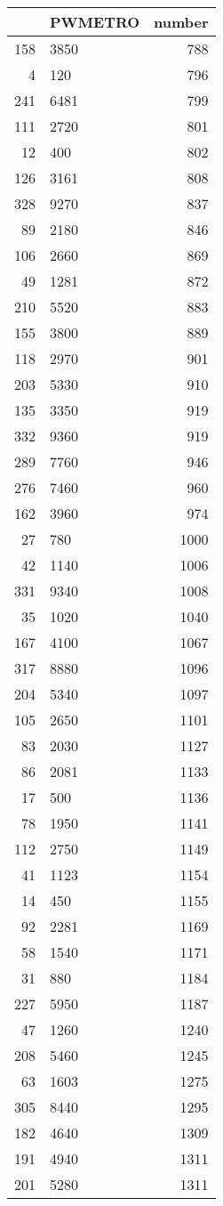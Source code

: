 \begin{table}[ht]
\centering
\begin{tabular}{rlr}
  \hline
 & PWMETRO & number \\ 
  \hline
158 & 3850 & 788 \\ 
  4 & 120 & 796 \\ 
  241 & 6481 & 799 \\ 
  111 & 2720 & 801 \\ 
  12 & 400 & 802 \\ 
  126 & 3161 & 808 \\ 
  328 & 9270 & 837 \\ 
  89 & 2180 & 846 \\ 
  106 & 2660 & 869 \\ 
  49 & 1281 & 872 \\ 
  210 & 5520 & 883 \\ 
  155 & 3800 & 889 \\ 
  118 & 2970 & 901 \\ 
  203 & 5330 & 910 \\ 
  135 & 3350 & 919 \\ 
  332 & 9360 & 919 \\ 
  289 & 7760 & 946 \\ 
  276 & 7460 & 960 \\ 
  162 & 3960 & 974 \\ 
  27 & 780 & 1000 \\ 
  42 & 1140 & 1006 \\ 
  331 & 9340 & 1008 \\ 
  35 & 1020 & 1040 \\ 
  167 & 4100 & 1067 \\ 
  317 & 8880 & 1096 \\ 
  204 & 5340 & 1097 \\ 
  105 & 2650 & 1101 \\ 
  83 & 2030 & 1127 \\ 
  86 & 2081 & 1133 \\ 
  17 & 500 & 1136 \\ 
  78 & 1950 & 1141 \\ 
  112 & 2750 & 1149 \\ 
  41 & 1123 & 1154 \\ 
  14 & 450 & 1155 \\ 
  92 & 2281 & 1169 \\ 
  58 & 1540 & 1171 \\ 
  31 & 880 & 1184 \\ 
  227 & 5950 & 1187 \\ 
  47 & 1260 & 1240 \\ 
  208 & 5460 & 1245 \\ 
  63 & 1603 & 1275 \\ 
  305 & 8440 & 1295 \\ 
  182 & 4640 & 1309 \\ 
  191 & 4940 & 1311 \\ 
  201 & 5280 & 1311 \\ 
   \hline
\end{tabular}
\end{table}
